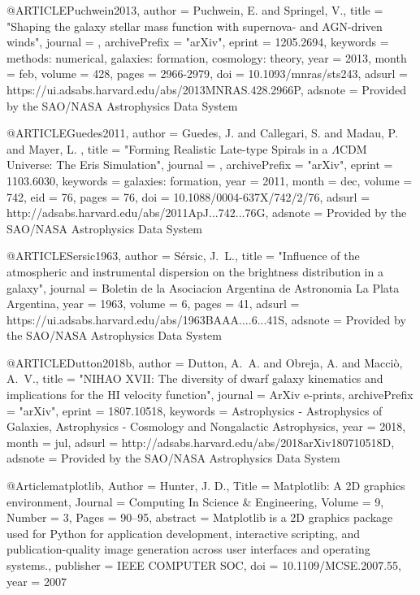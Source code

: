 \documentclass[useAMS,usenatbib]{mnras}
\begin{document}
{{{{{{{{{{{{{{{@ARTICLE{Puchwein2013,
   author = {{Puchwein}, E. and {Springel}, V.},
    title = "{Shaping the galaxy stellar mass function with supernova- and AGN-driven winds}",
  journal = {\mnras},
archivePrefix = "arXiv",
   eprint = {1205.2694},
 keywords = {methods: numerical, galaxies: formation, cosmology: theory},
     year = 2013,
    month = feb,
   volume = 428,
    pages = {2966-2979},
      doi = {10.1093/mnras/sts243},
   adsurl = {https://ui.adsabs.harvard.edu/abs/2013MNRAS.428.2966P},
  adsnote = {Provided by the SAO/NASA Astrophysics Data System}
}

@ARTICLE{Guedes2011,
   author = {{Guedes}, J. and {Callegari}, S. and {Madau}, P. and {Mayer}, L.
	},
    title = "{Forming Realistic Late-type Spirals in a {$\Lambda$}CDM Universe: The Eris Simulation}",
  journal = {\apj},
archivePrefix = "arXiv",
   eprint = {1103.6030},
 keywords = {galaxies: formation},
     year = 2011,
    month = dec,
   volume = 742,
      eid = {76},
    pages = {76},
      doi = {10.1088/0004-637X/742/2/76},
   adsurl = {http://adsabs.harvard.edu/abs/2011ApJ...742...76G},
  adsnote = {Provided by the SAO/NASA Astrophysics Data System}
}

@ARTICLE{Sersic1963,
   author = {{S{\'e}rsic}, J.~L.},
    title = "{Influence of the atmospheric and instrumental dispersion on the brightness distribution in a galaxy}",
  journal = {Boletin de la Asociacion Argentina de Astronomia La Plata Argentina},
     year = 1963,
   volume = 6,
    pages = {41},
   adsurl = {https://ui.adsabs.harvard.edu/abs/1963BAAA....6...41S},
  adsnote = {Provided by the SAO/NASA Astrophysics Data System}
}

@ARTICLE{Dutton2018b,
   author = {{Dutton}, A.~A. and {Obreja}, A. and {Macci{\`o}}, A.~V.},
    title = "{NIHAO XVII: The diversity of dwarf galaxy kinematics and implications for the HI velocity function}",
  journal = {ArXiv e-prints},
archivePrefix = "arXiv",
   eprint = {1807.10518},
 keywords = {Astrophysics - Astrophysics of Galaxies, Astrophysics - Cosmology and Nongalactic Astrophysics},
     year = 2018,
    month = jul,
   adsurl = {http://adsabs.harvard.edu/abs/2018arXiv180710518D},
  adsnote = {Provided by the SAO/NASA Astrophysics Data System}
}

@Article{matplotlib,
  Author    = {Hunter, J. D.},
  Title     = {Matplotlib: A 2D graphics environment},
  Journal   = {Computing In Science \& Engineering},
  Volume    = {9},
  Number    = {3},
  Pages     = {90--95},
  abstract  = {Matplotlib is a 2D graphics package used for Python
  for application development, interactive scripting, and
  publication-quality image generation across user
  interfaces and operating systems.},
  publisher = {IEEE COMPUTER SOC},
  doi = {10.1109/MCSE.2007.55},
  year      = 2007
}

}}}}}}}}}}}}}}}
\end{document}
